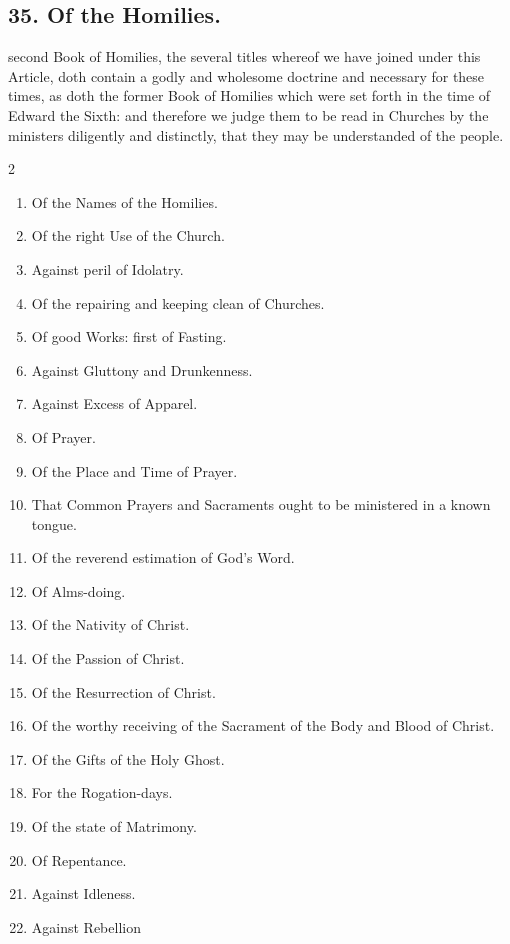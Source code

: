 \subsection{35. Of the Homilies.}
 second Book of Homilies, the several titles whereof we have joined under this Article, doth contain a godly and wholesome doctrine and necessary for these times, as doth the former Book of Homilies which were set forth in the time of Edward the Sixth: and therefore we judge them to be read in Churches by the ministers diligently and distinctly, that they may be understanded of the people.
\small
\begin{multicols}{2}
\begin{enumerate}
\item Of the Names of the Homilies.
\item Of the right Use of the Church.
\item Against peril of Idolatry.
\item Of the repairing and keeping clean of Churches.
\item Of good Works: first of Fasting.
\item Against Gluttony and Drunkenness.
\item Against Excess of Apparel.
\item Of Prayer.
\item Of the Place and Time of Prayer.
\item That Common Prayers and Sacraments ought to be ministered in a known tongue.
\item Of the reverend estimation of God's Word.
\item Of Alms-doing.
\item Of the Nativity of Christ.
\item Of the Passion of Christ.
\item Of the Resurrection of Christ.
\item Of the worthy receiving of the Sacrament of the Body and Blood of Christ.
\item Of the Gifts of the Holy Ghost.
\item For the Rogation-days.
\item Of the state of Matrimony.
\item Of Repentance.
\item Against Idleness.
\item Against Rebellion
\end{enumerate}
\end{multicols}
\normalsize

